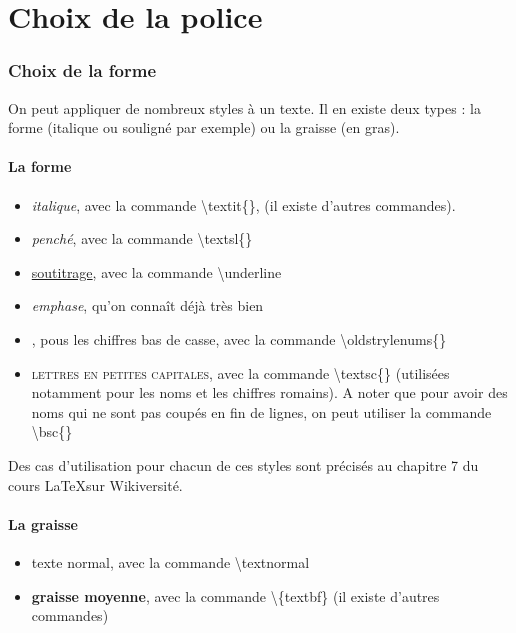 \documentclass[a4paper, 10pt]{article}
\begin{document}
\part{Choix de la police}
\section{Choix de la forme}
On peut appliquer de nombreux styles à un texte. Il en existe deux types : la forme (italique ou souligné par exemple) ou la graisse (en gras).

\subsection{La forme}

\begin{itemize}

\item \textit{italique}, avec la commande \textbackslash textit\{\},  (il existe d'autres commandes).
\item \textsl{penché}, avec la commande \textbackslash textsl\{\}
\item \underline{soutitrage}, avec la commande \textbackslash underline
\item \emph{emphase}, qu'on connaît déjà très bien
\item {}, pous les chiffres bas de casse, avec la commande \textbackslash oldstrylenums\{\}
\item \textsc{lettres en petites capitales}, avec la commande \textbackslash textsc\{\} (utilisées notamment pour les noms et les chiffres romains). A noter que pour avoir des noms qui ne sont pas coupés en fin de lignes, on peut utiliser la commande \textbackslash bsc\{\}

\end{itemize}
 Des cas d'utilisation pour chacun de ces styles sont précisés au chapitre 7 du cours \LaTeX sur Wikiversité.

\subsection{La graisse}

\begin{itemize}

\item \textnormal{texte normal}, avec  la commande \textbackslash textnormal
\item \textbf{graisse moyenne}, avec la commande \textbackslash \{textbf\} (il existe d'autres commandes)

\end{itemize}
\end{document}

